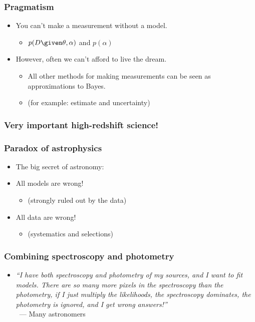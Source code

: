 \documentclass[pdftex]{beamer}
\begin{document}
\begin{frame}
  \frametitle{Pragmatism}
  \begin{itemize}
  \item You can't make a measurement without a model.
    \begin{itemize}
    \item $p(D\given\theta,\alpha)$ and $p(\alpha)$
    \end{itemize}
  \item However, often we can't afford to live the dream.
    \begin{itemize}
    \item All other methods for making measurements can be seen as
      approximations to Bayes.
    \item (for example: estimate and uncertainty)
    \end{itemize}
  \end{itemize}
\end{frame}

\begin{frame}
  \frametitle{Very important high-redshift science!}
\end{frame}

\begin{frame}
  \frametitle{Paradox of astrophysics}
  \begin{itemize}
  \item The big secret of astronomy:
  \item<2-> All models are wrong!
    \begin{itemize}
    \item (strongly ruled out by the data)
    \end{itemize}
  \item<3> All data are wrong!
    \begin{itemize}
    \item (systematics and selections)
    \end{itemize}
  \end{itemize}
\end{frame}

\begin{frame}
  \frametitle{Combining spectroscopy and photometry}
  \begin{itemize}
  \item \textit{``I have both spectroscopy and photometry of my sources, and I
    want to fit models. There are so many more pixels in the
    spectroscopy than the photometry, if I just multiply the
    likelihoods, the spectroscopy dominates, the photometry is
    ignored, and I get wrong answers!''} \\ ~\hfill --- Many
    astronomers
  \end{itemize}
\end{frame}
\end{document}
